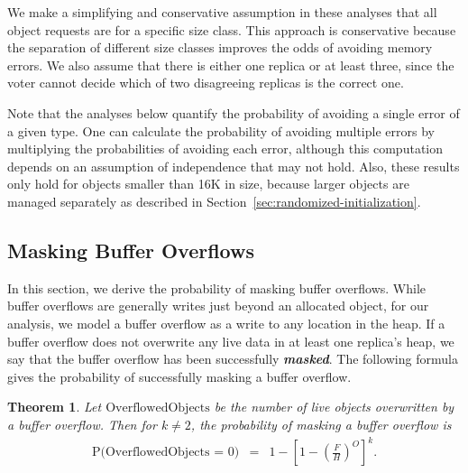 \documentclass{sig-alternate}
\newtheorem{thm}{Theorem}
\begin{document}
We make a simplifying and conservative assumption in these analyses
that all object requests are for a specific size class. This approach
is conservative because the separation of different size classes
improves the odds of avoiding memory errors. We also assume that there
is either one replica or at least three, since the voter cannot decide
which of two disagreeing replicas is the correct one.

Note that the analyses below quantify the probability of avoiding a
single error of a given type. One can calculate the probability of
avoiding multiple errors by multiplying the probabilities of avoiding each
error, although this computation depends on an assumption of independence
that may not hold. Also, these results only hold for objects smaller
than 16K in size, because larger objects are managed separately as
described in Section~\ref{sec:randomized-initialization}.





\subsection{Masking Buffer Overflows}

\label{sec:masking_buffer_overflows}

\noindent
In this section, we derive the probability of masking buffer
overflows. While buffer overflows are generally writes just beyond an
allocated object, for our analysis, we model a buffer overflow as a
write to any location in the heap. If a buffer overflow does not
overwrite any live data in at least one replica's heap, we say that
the buffer overflow has been successfully \emph{\bf masked}. The following
formula gives the probability of successfully masking a buffer
overflow.


\begin{thm}
\mbox{}
Let $\mbox{OverflowedObjects}$ be the number of live objects
overwritten by a buffer overflow. Then for $k \neq 2$, the probability
of masking a buffer overflow is
\begin{eqnarray*}
\mbox{P(OverflowedObjects = 0)} & =    & 1 - \left[1 - \left(\tfrac{F}{H}\right)^{O}\right]^k.
\end{eqnarray*}
\label{thm:mask_overflow}
\end{thm}
\end{document}
